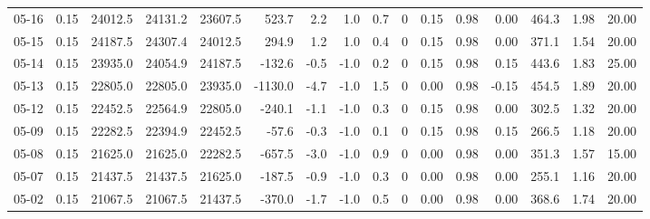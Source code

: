 \begin{threeparttable}
{\begin{tabular}{lrrrrrrrrrrrrrrr}
  05-16 &     0.15 & 24012.5 & 24131.2 & 23607.5 &      523.7 &            2.2 &                      1.0 &                 0.7 &              0 &       0.15 &      0.98 &           0.00 &            464.3 &            1.98 &                  20.00 \\
  05-15 &     0.15 & 24187.5 & 24307.4 & 24012.5 &      294.9 &            1.2 &                      1.0 &                 0.4 &              0 &       0.15 &      0.98 &           0.00 &            371.1 &            1.54 &                  20.00 \\
  05-14 &     0.15 & 23935.0 & 24054.9 & 24187.5 &     -132.6 &           -0.5 &                     -1.0 &                 0.2 &              0 &       0.15 &      0.98 &           0.15 &            443.6 &            1.83 &                  25.00 \\
  05-13 &     0.15 & 22805.0 & 22805.0 & 23935.0 &    -1130.0 &           -4.7 &                     -1.0 &                 1.5 &              0 &       0.00 &      0.98 &          -0.15 &            454.5 &            1.89 &                  20.00 \\
  05-12 &     0.15 & 22452.5 & 22564.9 & 22805.0 &     -240.1 &           -1.1 &                     -1.0 &                 0.3 &              0 &       0.15 &      0.98 &           0.00 &            302.5 &            1.32 &                  20.00 \\
  05-09 &     0.15 & 22282.5 & 22394.9 & 22452.5 &      -57.6 &           -0.3 &                     -1.0 &                 0.1 &              0 &       0.15 &      0.98 &           0.15 &            266.5 &            1.18 &                  20.00 \\
  05-08 &     0.15 & 21625.0 & 21625.0 & 22282.5 &     -657.5 &           -3.0 &                     -1.0 &                 0.9 &              0 &       0.00 &      0.98 &           0.00 &            351.3 &            1.57 &                  15.00 \\
  05-07 &     0.15 & 21437.5 & 21437.5 & 21625.0 &     -187.5 &           -0.9 &                     -1.0 &                 0.3 &              0 &       0.00 &      0.98 &           0.00 &            255.1 &            1.16 &                  20.00 \\
  05-02 &     0.15 & 21067.5 & 21067.5 & 21437.5 &     -370.0 &           -1.7 &                     -1.0 &                 0.5 &              0 &       0.00 &      0.98 &           0.00 &            368.6 &            1.74 &                  20.00 \\

\end{tabular}}
\end{threeparttable}
